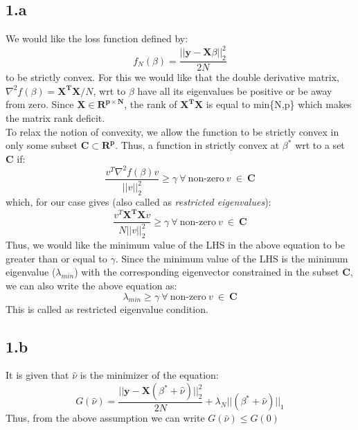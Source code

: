 \documentclass[12pt]{article}
\begin{document}
\subsection*{1.a}
We would like the loss function defined by:
\begin{equation*}
    f_N(\beta) = \frac{|| \boldsymbol{y-X}\beta||^2_2}{2N}
\end{equation*}
to be strictly convex. For this we would like that the double derivative matrix, $\nabla^2 f(\beta) = \boldsymbol{X^TX}/N$, wrt to $\beta$ have all its eigenvalues be positive or be away from zero. Since $\boldsymbol{X} \in \boldsymbol{R^{p \times N}}$, the rank of $\boldsymbol{X^TX}$ is equal to min\{N,p\} which makes the matrix rank deficit.\\
To relax the notion of convexity, we allow the function to be strictly convex in only some subset $\boldsymbol{C} \subset \boldsymbol{R^p}$. Thus, a function in strictly convex at $\beta^*$ wrt to a set $\boldsymbol{C}$ if:
\begin{equation*}
    \frac{v^T\nabla^2 f(\beta)v}{||v||^2_2} \geq \gamma \ \forall \ \textrm{non-zero} \ v \ \in \ \boldsymbol{C}
\end{equation*}
which, for our case gives (also called as \textit{restricted eigenvalues}):
\begin{equation*}
    \frac{v^T\boldsymbol{X^TX}v}{N||v||^2_2} \geq \gamma \ \forall \ \textrm{non-zero} \ v \ \in \ \boldsymbol{C}
\end{equation*}
Thus, we would like the minimum value of the LHS in the above equation to be greater than or equal to $\gamma$. Since the minimum value of the LHS is the minimum eigenvalue ($\lambda_{min}$) with the corresponding eigenvector constrained in the subset $\boldsymbol{C}$, we can also write the above equation as:
\begin{equation*}
    \lambda_{min} \geq \gamma \ \forall \ \textrm{non-zero} \ v \ \in \ \boldsymbol{C}
\end{equation*}
This is called as restricted eigenvalue condition.
\subsection*{1.b}
It is given that $\hat{\nu}$ is the minimizer of the equation:
\begin{equation*}
    G(\hat{\nu}) = \frac{||\boldsymbol{y-X}(\beta^*+\hat{\nu})||^2_2}{2N}+\lambda_N||(\beta^*+\hat{\nu})||_1
\end{equation*}
Thus, from the above assumption we can write $G(\hat{\nu}) \leq G(0)$
\end{document}
